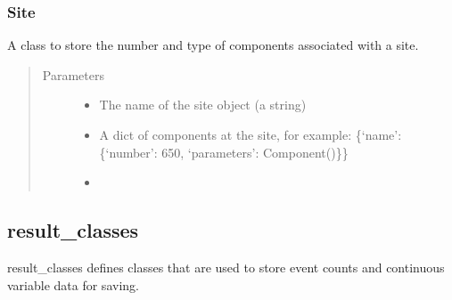 \documentclass[letterpaper,10pt,english]{sphinxmanual}
\begin{document}
\subsubsection{Site}
\label{\detokenize{index:site}}

\begin{fulllineitems}
\label{\detokenize{index:feast.EmissionSimModules.infrastructure_classes.Site}}
A class to store the number and type of components associated with a site.
\begin{quote}\begin{description}
\item[{Parameters}] \leavevmode\begin{itemize}
\item {} 
 \textendash{} The name of the site object (a string)

\item {} 
 \textendash{} A dict of components at the site, for example:
\{‘name’: \{‘number’: 650, ‘parameters’: Component()\}\}

\item {} 
 \textendash{} 

\end{itemize}

\end{description}\end{quote}

\end{fulllineitems}



\subsection{result\_classes}
\label{\detokenize{index:module-feast.EmissionSimModules.result_classes}}\label{\detokenize{index:result-classes}}
result\_classes defines classes that are used to store event counts and continuous variable data for saving.
\end{document}
